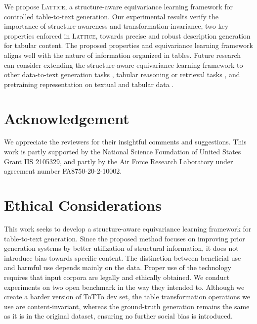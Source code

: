 \documentclass[11pt]{article}
\newcommand{\model}{\mbox{\textsc{Lattice}}\xspace}
\begin{document}
We propose \model, a structure-aware equivariance learning framework for controlled table-to-text generation.
Our experimental results verify the importance of structure-awareness and transformation-invariance, two key properties enforced in \model, towards precise and robust description generation for tabular content.
The proposed properties and equivariance learning framework aligns well with the nature of information organized in tables. Future research can consider extending the structure-aware equivariance learning framework to other data-to-text generation tasks \citep{koncel2019text,nan2021dart}, tabular reasoning or retrieval tasks \cite{gupta2020infotabs,wang2021retrieving,wang2021table,eisenschlos2021mate}, and pretraining representation on textual and tabular data \cite{yin2020tabert,herzig2020tapas,iida2021tabbie}.


\section*{Acknowledgement}

We appreciate the reviewers for their insightful comments and suggestions.
This work is partly supported by the National Science Foundation of United States Grant IIS 2105329,
and partly by the Air Force Research Laboratory under agreement number FA8750-20-2-10002. 
\section*{Ethical Considerations}

This work seeks to develop a structure-aware equivariance learning framework for table-to-text generation. 
Since the proposed method focuses on improving prior generation systems by better utilization of structural information, it does not introduce bias towards specific content.
The distinction between beneficial use and harmful use depends mainly on the data.
Proper use of the technology requires that input corpora are legally and ethically obtained.
We conduct experiments on two open benchmark in the way they intended to.
Although we create a harder version of ToTTo dev set, the table transformation operations we use are content-invariant, whereas the ground-truth generation remains the same as it is in the original dataset, ensuring no further social bias is introduced. 










 


\end{document}
